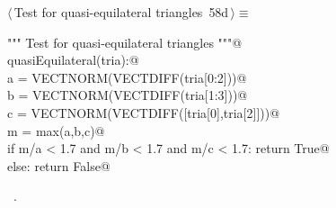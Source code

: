 \documentclass[11pt,oneside]{article}    %
\begin{document}
\begin{flushleft} \small \label{scrap113}
\protect{}$\langle\,$Test for quasi-equilateral triangles\nobreak\ {\footnotesize 58d}$\,\rangle\equiv$
\vspace{-1ex}
\begin{list}{}{} \item
\mbox{}\verb@""" Test for quasi-equilateral triangles """@\\
\mbox{}\verb@def quasiEquilateral(tria):@\\
\mbox{}\verb@    a = VECTNORM(VECTDIFF(tria[0:2]))@\\
\mbox{}\verb@    b = VECTNORM(VECTDIFF(tria[1:3]))@\\
\mbox{}\verb@    c = VECTNORM(VECTDIFF([tria[0],tria[2]]))@\\
\mbox{}\verb@    m = max(a,b,c)@\\
\mbox{}\verb@    if m/a < 1.7 and m/b < 1.7 and m/c < 1.7: return True@\\
\mbox{}\verb@    else: return False@\\
\mbox{}\verb@@{\NWsep}
\end{list}
\vspace{-1ex}
\footnotesize\addtolength{\baselineskip}{-1ex}
\begin{list}{}{\setlength{\itemsep}{-\parsep}\setlength{\itemindent}{-\leftmargin}}
\item \NWtxtMacroRefIn\ .
\end{list}
\end{flushleft}
\end{document}

